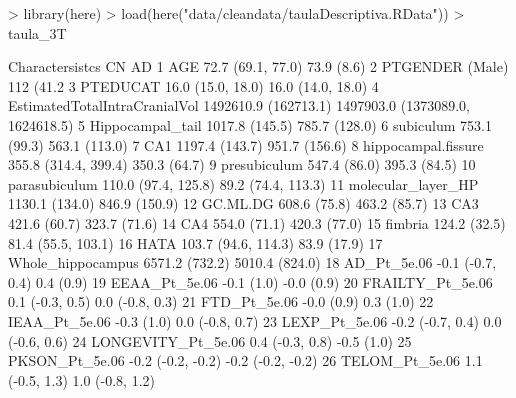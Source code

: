 \documentclass[10pt,a4paper,twoside]{article}
\begin{document}
\begin{Schunk}
\begin{Sinput}
> library(here)
> load(here("data/cleandata/taulaDescriptiva.RData"))
> taula_3T
\end{Sinput}
\begin{Soutput}
                 Charactersistcs                   CN                               AD
1                            AGE    72.7 (69.1, 77.0)                       73.9 (8.6)
2                PTGENDER (Male)          112 (41.2%)                       61 (54.0%)
3                       PTEDUCAT    16.0 (15.0, 18.0)                16.0 (14.0, 18.0)
4  EstimatedTotalIntraCranialVol 1492610.9 (162713.1) 1497903.0 (1373089.0, 1624618.5)
5               Hippocampal_tail       1017.8 (145.5)                    785.7 (128.0)
6                      subiculum         753.1 (99.3)                    563.1 (113.0)
7                            CA1       1197.4 (143.7)                    951.7 (156.6)
8            hippocampal.fissure 355.8 (314.4, 399.4)                     350.3 (64.7)
9                   presubiculum         547.4 (86.0)                     395.3 (84.5)
10                 parasubiculum  110.0 (97.4, 125.8)               89.2 (74.4, 113.3)
11            molecular_layer_HP       1130.1 (134.0)                    846.9 (150.9)
12                      GC.ML.DG         608.6 (75.8)                     463.2 (85.7)
13                           CA3         421.6 (60.7)                     323.7 (71.6)
14                           CA4         554.0 (71.1)                     420.3 (77.0)
15                       fimbria         124.2 (32.5)               81.4 (55.5, 103.1)
16                          HATA  103.7 (94.6, 114.3)                      83.9 (17.9)
17             Whole_hippocampus       6571.2 (732.2)                   5010.4 (824.0)
18                   AD_Pt_5e.06     -0.1 (-0.7, 0.4)                        0.4 (0.9)
19                 EEAA_Pt_5e.06           -0.1 (1.0)                       -0.0 (0.9)
20              FRAILTY_Pt_5e.06      0.1 (-0.3, 0.5)                  0.0 (-0.8, 0.3)
21                  FTD_Pt_5e.06           -0.0 (0.9)                        0.3 (1.0)
22                 IEAA_Pt_5e.06           -0.3 (1.0)                  0.0 (-0.8, 0.7)
23                 LEXP_Pt_5e.06     -0.2 (-0.7, 0.4)                  0.0 (-0.6, 0.6)
24            LONGEVITY_Pt_5e.06      0.4 (-0.3, 0.8)                       -0.5 (1.0)
25                PKSON_Pt_5e.06    -0.2 (-0.2, -0.2)                -0.2 (-0.2, -0.2)
26                TELOM_Pt_5e.06      1.1 (-0.5, 1.3)                  1.0 (-0.8, 1.2)

\end{Soutput}
\end{Schunk}
\end{document}

